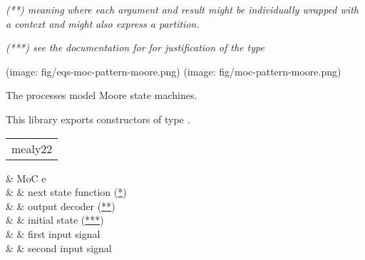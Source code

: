 \begin{haddockdesc}
 \emph{(**) meaning }  \emph{where each argument}
 \emph{and result might be individually wrapped with a context and might}
 \emph{also express a partition.}\par
 \emph{(***) see the documentation for \haddockid{-<-} for justification}
 \emph{of the type}\par
(image: fig/eqs-moc-pattern-moore.png)
 (image: fig/moc-pattern-moore.png)\par
The  processes model Moore state machines.\par
This library exports constructors of type .\par

\end{haddockdesc}
\begin{haddockdesc}
\item[\begin{tabular}{@{}l}
mealy22
\end{tabular}]\haddockbegindoc
\haddockbeginargs
\haddockdecltt{::} & MoC e \\
                     \haddockdecltt{=>} &  & next state function (\href{#mealy22ns}{*}) \\
                                                                                                      \haddockdecltt{->} &  & output decoder (\href{#mealy22od}{**}) \\
                                                                                                                                                                                                 \haddockdecltt{->} &  & initial state (\href{#mealy22i}{***}) \\
                                                                                                                                                                                                                                                      \haddockdecltt{->} &  & first input signal \\
                                                                                                                                                                                                                                                                                                           \haddockdecltt{->} &  & second input signal \\

\end{haddockdesc}
